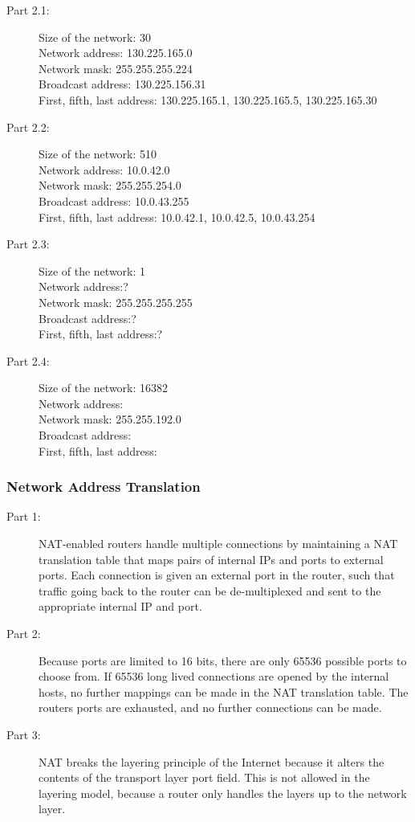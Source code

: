 \begin{description}
    \item[Part 2.1:]
        Size of the network: 30\\
        Network address: 130.225.165.0\\
        Network mask: 255.255.255.224\\
        Broadcast address: 130.225.156.31\\
        First, fifth, last address: 130.225.165.1, 130.225.165.5, 130.225.165.30
    \item[Part 2.2:]
        Size of the network: 510\\
        Network address: 10.0.42.0\\
        Network mask: 255.255.254.0\\
        Broadcast address: 10.0.43.255\\
        First, fifth, last address: 10.0.42.1, 10.0.42.5, 10.0.43.254
    \item[Part 2.3:]
        Size of the network: 1\\
        Network address:?\\
        Network mask: 255.255.255.255\\
        Broadcast address:?\\
        First, fifth, last address:?
    \item[Part 2.4:]
        Size of the network: 16382\\
        Network address: \\
        Network mask: 255.255.192.0\\
        Broadcast address: \\
        First, fifth, last address: 
\end{description}

\subsubsection{Network Address Translation}
\begin{description}
    \item[Part 1:] NAT-enabled routers handle multiple connections by maintaining a NAT translation
        table that maps pairs of internal IPs and ports to external ports. Each connection is given
        an external port in the router, such that traffic going back to the router can be de-multiplexed
        and sent to the appropriate internal IP and port.
    \item[Part 2:] Because ports are limited to 16 bits, there are only 65536 possible ports to choose from.
        If 65536 long lived connections are opened by the internal hosts, no further mappings can be made in
        the NAT translation table. The routers ports are exhausted, and no further connections can be made.
    \item[Part 3:] NAT breaks the layering principle of the Internet because it alters the contents of the 
        transport layer port field. This is not allowed in the layering model, because a router only handles
        the layers up to the network layer.
\end{description}

